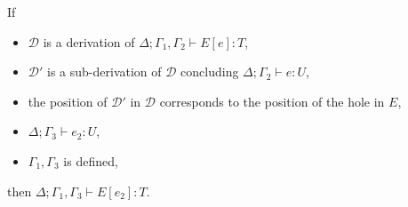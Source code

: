 \begin{lemma}
  \label{lem:derivation-elim}
  If
  \begin{itemize}
  \item $\mathcal D$ is a derivation of
    $\Delta;\Gamma_1,\Gamma_2 \vdash E[e] : T$,
  \item $\mathcal D'$ is a sub-derivation of $\mathcal D$
    concluding $\Delta;\Gamma_2 \vdash e : U$,
  \item the position of $\mathcal D'$ in $\mathcal D$ corresponds
    to the position of the hole in $E$,
  \item $\Delta;\Gamma_3 \vdash e_2 : U$,
  \item $\Gamma_1,\Gamma_3$ is defined,
  \end{itemize}
then
  $\Delta;\Gamma_1,\Gamma_3 \vdash E[e_2] : T$.
\end{lemma}


